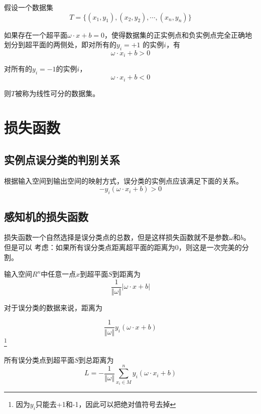 假设一个数据集
\begin{equation}
    T=\{(x_1,y_1),(x_2,y_2),\cdots,(x_n,y_n)\}
\end{equation}

如果存在一个超平面$\omega\cdot x+b=0$，使得数据集的正实例点和负实例点完全正确地划分到超平面的两侧处，即对所有的$y_i=+1$
的实例$i$，有
\begin{equation}
    \omega\cdot x_i+b>0
\end{equation}

对所有的$y_i=-1$的实例$i$，
\begin{equation}
    \omega\cdot x_i+b<0
\end{equation}


则$T$被称为线性可分的数据集。


\section{损失函数}

\subsection*{实例点误分类的判别关系}

根据输入空间到输出空间的映射方式，误分类的实例点应该满足下面的关系。
\begin{equation}
    -y_i(\omega\cdot x_i+b)>0
\end{equation}

\subsection*{感知机的损失函数}

损失函数一个自然选择是误分类点的总数，但是这样损失函数就不是参数$\omega$和$b$。但是可以
考虑：如果所有误分类点距离超平面的距离为0，则这是一次完美的分割。

输入空间$R^n$中任意一点$x$到超平面$S$到距离为
\begin{equation}
    \frac{1}{\Vert \omega\Vert}|\omega\cdot x+b|
\end{equation}

对于误分类的数据来说，距离为

\begin{equation}
    \frac{1}{\Vert \omega\Vert}y_i(\omega\cdot x+b)
\end{equation}\footnote{因为$y_i$只能去+1和-1，因此可以把绝对值符号去掉}

所有误分类点到超平面$S$到总距离为
\begin{equation}
    L=-\frac{1}{\Vert \omega\Vert}\sum_{x_i\in M}^{n}y_i(\omega\cdot x_i+b)
\end{equation}

